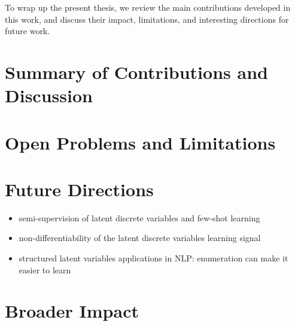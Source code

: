 \label{cap:conclusions}

\doublespacing

To wrap up the present thesis, we review the main contributions
developed in this work, and discuss their impact, limitations, and
interesting directions for future work.

\section{Summary of Contributions and Discussion}

\section{Open Problems and Limitations}

\section{Future Directions}

\begin{itemize}
    \item semi-supervision of latent discrete variables and few-shot learning
    \item non-differentiability of the latent discrete variables learning signal
    \item structured latent variables applications in NLP: enumeration can make it easier to learn
\end{itemize}

\section{Broader Impact}

